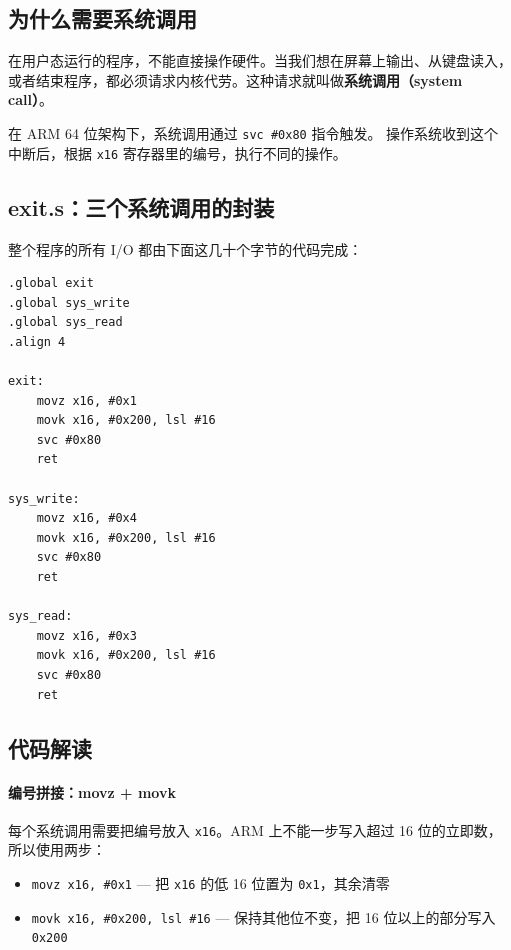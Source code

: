 \subsection{为什么需要系统调用}

在用户态运行的程序，不能直接操作硬件。当我们想在屏幕上输出、从键盘读入，
或者结束程序，都必须请求内核代劳。这种请求就叫做\textbf{系统调用（system call）}。

在 ARM 64 位架构下，系统调用通过 \texttt{svc \#0x80} 指令触发。
操作系统收到这个中断后，根据 \texttt{x16} 寄存器里的编号，执行不同的操作。

\subsection{exit.s：三个系统调用的封装}

整个程序的所有 I/O 都由下面这几十个字节的代码完成：

\begin{lstlisting}[style=asm,caption=ISA/src/exit.s —— sys\_write / sys\_read / exit]
.global exit
.global sys_write
.global sys_read
.align 4

exit:
    movz x16, #0x1
    movk x16, #0x200, lsl #16
    svc #0x80
    ret

sys_write:
    movz x16, #0x4
    movk x16, #0x200, lsl #16
    svc #0x80
    ret

sys_read:
    movz x16, #0x3
    movk x16, #0x200, lsl #16
    svc #0x80
    ret
\end{lstlisting}

\subsection{代码解读}

\paragraph{编号拼接：movz + movk}
每个系统调用需要把编号放入 \texttt{x16}。ARM 上不能一步写入超过 16 位的立即数，
所以使用两步：

\begin{itemize}
    \item \texttt{movz x16, \#0x1} — 把 \texttt{x16} 的低 16 位置为 \texttt{0x1}，其余清零
    \item \texttt{movk x16, \#0x200, lsl \#16} — 保持其他位不变，把 16 位以上的部分写入 \texttt{0x200}
\end{itemize}

